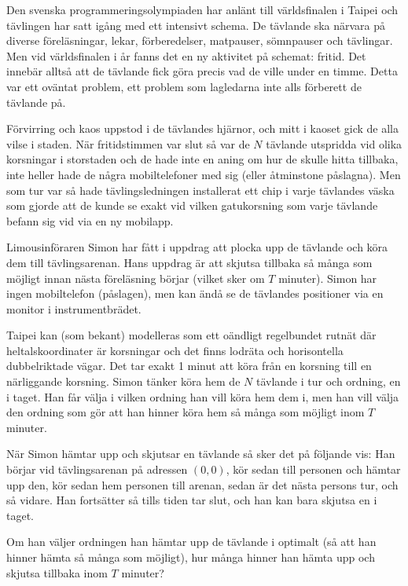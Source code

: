 Den svenska programmeringsolympiaden har anlänt till världsfinalen i Taipei och tävlingen har satt igång med ett intensivt schema. De tävlande ska närvara på diverse föreläsningar, lekar, förberedelser, matpauser, sömnpauser och tävlingar. Men vid världsfinalen i år fanns det en ny aktivitet på schemat: fritid. Det innebär alltså att de tävlande fick göra precis vad de ville under en timme. Detta var ett oväntat problem, ett problem som lagledarna inte alls förberett de tävlande på.

Förvirring och kaos uppstod i de tävlandes hjärnor, och mitt i kaoset gick de alla vilse i staden. När fritidstimmen var slut så var de $N$ tävlande utspridda vid olika korsningar i storstaden och de hade inte en aning om hur de skulle hitta tillbaka, inte heller hade de några mobiltelefoner med sig (eller åtminstone påslagna). Men som tur var så hade tävlingsledningen installerat ett chip i varje tävlandes väska som gjorde att de kunde se exakt vid vilken gatukorsning som varje tävlande befann sig vid via en ny mobilapp.

Limousinföraren Simon har fått i uppdrag att plocka upp de tävlande och köra dem till tävlingsarenan. Hans uppdrag är att skjutsa tillbaka så många som möjligt innan nästa föreläsning börjar (vilket sker om $T$ minuter). Simon har ingen mobiltelefon (påslagen), men kan ändå se de tävlandes positioner via en monitor i instrumentbrädet.

Taipei kan (som bekant) modelleras som ett oändligt regelbundet rutnät där heltalskoordinater är korsningar och det finns lodräta och horisontella dubbelriktade vägar. Det tar exakt 1 minut att köra från en korsning till en närliggande korsning. Simon tänker köra hem de $N$ tävlande i tur och ordning, en i taget. Han får välja i vilken ordning han vill köra hem dem i, men han vill välja den ordning som gör att han hinner köra hem så många som möjligt inom $T$ minuter.

När Simon hämtar upp och skjutsar en tävlande så sker det på följande vis: Han börjar vid tävlingsarenan på adressen $(0, 0)$, kör sedan till personen och hämtar upp den, kör sedan hem personen till arenan, sedan är det nästa persons tur, och så vidare. Han fortsätter så tills tiden tar slut, och han kan bara skjutsa en i taget.

Om han väljer ordningen han hämtar upp de tävlande i optimalt (så att han hinner hämta så många som möjligt), hur många hinner han hämta upp och skjutsa tillbaka inom $T$ minuter?

